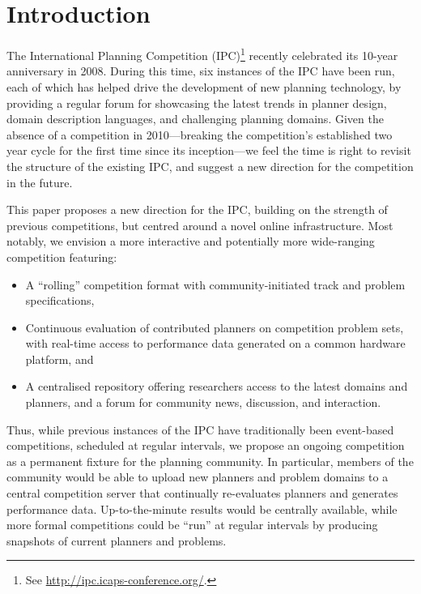 \section{Introduction}
\label{sec:introduction}


The International Planning Competition (IPC)\footnote{See
\url{http://ipc.icaps-conference.org/}.} recently celebrated its 10-year
anniversary in 2008. During this time, six instances of the IPC have been
run, each of which has helped drive the development of new planning
technology, by providing a regular forum for showcasing the latest trends
in planner design, domain description languages, and challenging planning
domains. Given the absence of a competition in 2010---breaking the
competition's established two year cycle for the first time since its
inception---we feel the time is right to revisit the structure of the
existing IPC, and suggest a new direction for the competition in the
future.

This paper proposes a new direction for the IPC, building on the strength
of previous competitions, but centred around a novel online infrastructure.
Most notably, we envision a more interactive and potentially more
wide-ranging competition featuring:
%
\begin{itemize}
\item A ``rolling'' competition format with community-initiated track and
problem specifications,

\item Continuous evaluation of contributed planners on competition
problem sets, with real-time access to performance data generated on a
common hardware platform, and

\item A centralised repository offering researchers access to the latest
domains and planners, and a forum for community news, discussion, and
interaction.
\end{itemize}

Thus, while previous instances of the IPC have traditionally been
event-based competitions, scheduled at regular intervals, we propose an
ongoing competition as a permanent fixture for the planning community. In
particular, members of the community would be able to upload new planners
and problem domains to a central competition server that continually
re-evaluates planners and generates performance data. Up-to-the-minute
results would be centrally available, while more formal competitions could
be ``run'' at regular intervals by producing snapshots of current planners
and problems. 

